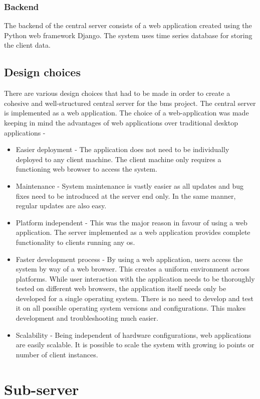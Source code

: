 \documentclass[letterpaper,11pt]{report}
\begin{document}
\subsubsection{Backend}
The backend of the central server consists of a web application created using the Python web framework Django. The system uses time series database for storing the client data.
\subsection{Design choices}
There are various design choices that had to be made in order to create a cohesive and well-structured central server for the \ac{bms} project. The central server is implemented as a web application. The choice of a web-application was made keeping in mind the advantages of web applications over traditional desktop applications -
\begin{itemize}
    \item Easier deployment - The application does not need to be individually deployed to any client machine. The client machine only requires a functioning web browser to access the system.
    \item Maintenance - System maintenance is vastly easier as all updates and bug fixes need to be introduced at the server end only. In the same manner, regular updates are also easy.
    \item Platform independent - This was the major reason in favour of using a web application. The server implemented as a web application provides complete functionality to clients running any \ac{os}.
    \item Faster development process - By using a web application, users access the system by way of a web browser. This creates a uniform environment across platforms. While user interaction with the application needs to be thoroughly tested on different web browsers, the application itself needs only be developed for a single operating system. There is no need to develop and test it on all possible operating system versions and configurations. This makes development and troubleshooting much easier.
    \item Scalability - Being independent of hardware configurations, web applications are easily scalable. It is possible to scale the system with growing \ac{io} points or number of client instances.
\end{itemize}
\section{Sub-server}
\end{document}
